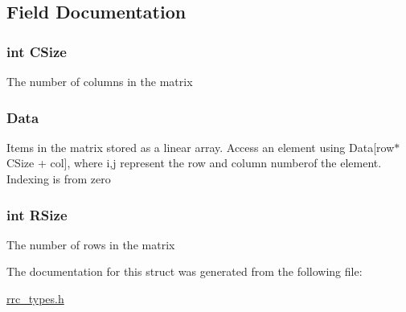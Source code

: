 \subsection{Field Documentation}
\hypertarget{struct_r_r_complex_matrix_a17c9a5894aa9cb3789346dcaa9c370bb}{
\subsubsection[{C\-Size}]{\setlength{\rightskip}{0pt plus 5cm}int C\-Size}}\label{struct_r_r_complex_matrix_a17c9a5894aa9cb3789346dcaa9c370bb}
The number of columns in the matrix \hypertarget{struct_r_r_complex_matrix_a2853286fc6b37960bba4c8871da839fa}{
\subsubsection[{Data}]{ Data}}\label{struct_r_r_complex_matrix_a2853286fc6b37960bba4c8871da839fa}
Items in the matrix stored as a linear array. Access an element using Data\mbox{[}row$\ast$\-C\-Size + col\mbox{]}, where i,j represent the row and column numberof the element. Indexing is from zero \hypertarget{struct_r_r_complex_matrix_a4d8512c879223c0e0d1522dae38e7819}{
\subsubsection[{R\-Size}]{\setlength{\rightskip}{0pt plus 5cm}int R\-Size}}\label{struct_r_r_complex_matrix_a4d8512c879223c0e0d1522dae38e7819}
The number of rows in the matrix 

The documentation for this struct was generated from the following file\-:\begin{DoxyCompactItemize}
\item 
\hyperlink{rrc__types_8h}{rrc\-\_\-types.\-h}\end{DoxyCompactItemize}
